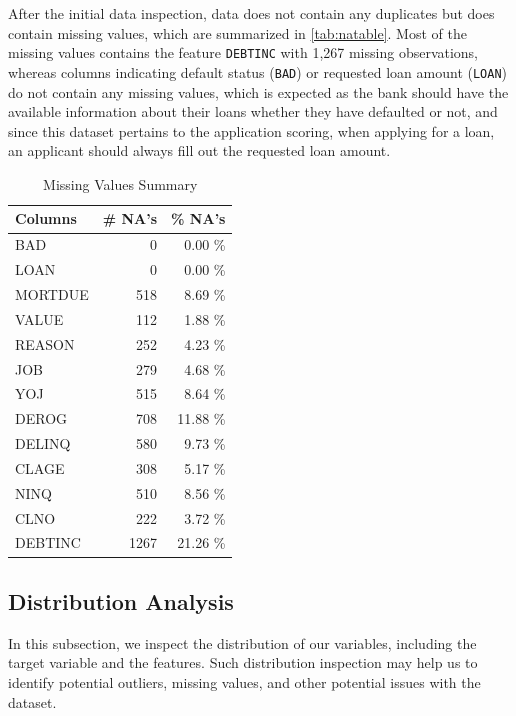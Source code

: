 After the initial data inspection, data does not contain any duplicates but does contain missing values, which are summarized in \autoref{tab:natable}.
Most of the missing values contains the feature \texttt{DEBTINC} with 1,267 missing observations, whereas columns indicating default status (\texttt{BAD}) or requested loan amount (\texttt{LOAN}) do not contain any missing values, which is expected as the bank should have the available information about their loans whether they have defaulted or not, and since this dataset pertains to the application scoring, when applying for a loan, an applicant should always fill out the requested loan amount.

\begin{table}[H]
    \small
    \setlength{\tabcolsep}{8pt}
    \renewcommand{\arraystretch}{1.3}
    \centering
        \caption[Missing Values Summary]{Missing Values Summary}\label{tab:natable}
    \begin{tabular}{l r r}
    \toprule
    \textbf{Columns} & \textbf{\# NA's} & \textbf{\% NA's}\\
    \midrule
    \hline
    BAD & 0 & 0.00 \% \\
LOAN & 0 & 0.00 \% \\
MORTDUE & 518 & 8.69 \% \\
VALUE & 112 & 1.88 \% \\
REASON & 252 & 4.23 \% \\
JOB & 279 & 4.68 \% \\
YOJ & 515 & 8.64 \% \\
DEROG & 708 & 11.88 \% \\
DELINQ & 580 & 9.73 \% \\
CLAGE & 308 & 5.17 \% \\
NINQ & 510 & 8.56 \% \\
CLNO & 222 & 3.72 \% \\
DEBTINC & 1267 & 21.26 \% \\
\hline
    \bottomrule
    \end{tabular}
    \vspace{0.35em}

    \vspace{-1em}
\end{table}


\subsection{Distribution Analysis}
In this subsection, we inspect the distribution of our variables, including the target variable and the features.
Such distribution inspection may help us to identify potential outliers, missing values, and other potential issues with the dataset.


